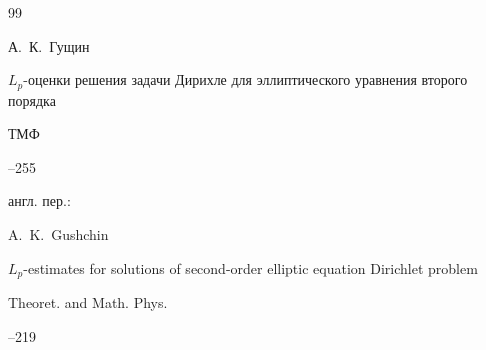 \begin{thebibliography}{99}
\pagebreak




\by А.~К.~Гущин

\paper $L_p$-оценки решения задачи Дирихле для эллиптического уравнения второго порядка

\jour ТМФ




--255


\transl англ. пер.:~

\by A.~K.~Gushchin

\paper $L_p$-estimates for solutions of second-order elliptic equation Dirichlet problem

\jour Theoret. and Math. Phys.




--219





\end{thebibliography}





\noindent

\hskip6.5cm \thedate \par\noindent

\hskip6.5cm\therevdate













\makeengtitlem



\newpage





%


%

%


